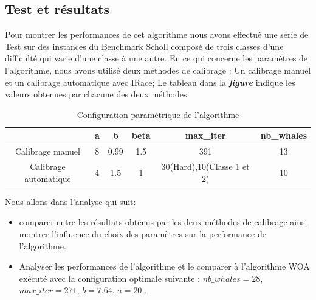 \documentclass[12pt]{article}
\begin{document}
\subsection{Test et résultats}
Pour montrer les performances de cet algorithme nous avons effectué une série de Test sur des instances du Benchmark \guillemotleft Scholl \guillemotright composé de trois classes d’une difficulté qui varie d’une classe à une autre.
En ce qui concerne les paramètres de l’algorithme, nous avons utilisé deux méthodes de calibrage : Un calibrage manuel et un calibrage automatique avec IRace; Le tableau dans la \textbf{\emph{figure }} indique les valeurs obtenues par chacune des deux méthodes.
\begin{table}[h!]
    \begin{center}
      \caption{Configuration paramétrique de l'algorithme}
      \label{tab:table1}
      \begin{tabular}{c|c|c|c|c|c} %
       \textbf{}&\textbf{a} & \textbf{b} &\textbf{beta} & \textbf{max\_iter} & \textbf{nb\_whales} \\
        \hline
        
        Calibrage manuel &8&0.99&1.5&391&13\\ 
        \hline
       Calibrage automatique&4&1.5&1&30(Hard),10(Classe 1 et 2)&10\\
        \hline
      \end{tabular}
    \end{center}
  \end{table}
\linebreak
 Nous allons dans l’analyse qui suit:
\begin{itemize}
    \item comparer entre les résultats obtenus par les deux méthodes de calibrage ainsi montrer l’influence du choix des paramètres sur la performance de l’algorithme.
    \item Analyser les performances de l’algorithme et le comparer à l’algorithme WOA exécuté avec la configuration optimale suivante : $nb\_whales=28$, $max\_iter=271$,  $b=7.64$, $a=20$ .
\end{itemize}
\end{document}
